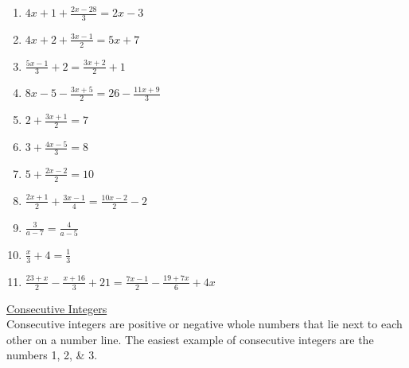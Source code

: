 \documentclass{article}
\begin{document}
\begin{enumerate}
\item {\Large $4x+1+\frac{2x-28}{3}=2x-3$}
\item {\Large $4x+2+\frac{3x-1}{2}=5x+7$}
\item {\Large $\frac{5x-1}{3}+2=\frac{3x+2}{2}+1$}
\item {\Large $8x-5-\frac{3x+5}{2}=26-\frac{11x+9}{3}$}
\item {\Large $2+\frac{3x+1}{2}=7$}
\item {\Large $3+\frac{4x-5}{3}=8$}
\item {\Large $5+\frac{2x-2}{2}=10$}
\item {\Large $\frac{2x+1}{2}+\frac{3x-1}{4}=\frac{10x-2}{2}-2$}
\item {\Large $\frac{3}{a-7}=\frac{4}{a-5}$}
\item {\Large $\frac{x}{3}+4=\frac{1}{3}$}
\item {\Large $\frac{23+x}{2}-\frac{x+16}{3}+21=\frac{7x-1}{2}-\frac{19+7x}{6}+4x$}
\end{enumerate}

\newpage
\underline{Consecutive Integers} \\
Consecutive integers are positive or negative whole numbers that lie next to each other on a number line. 
The easiest example of consecutive integers are the numbers 1, 2, \& 3.
\end{document}
